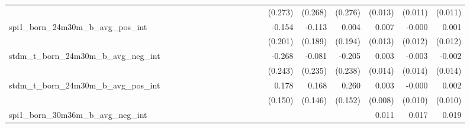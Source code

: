 \begin{tabular}{lrrrrrrrrrrrrrrrrrr}
                                            &              &              &              &              &              &              &              &              &               &              &              &               &      (0.273) &      (0.268) &       (0.276) &      (0.013) &      (0.011) &       (0.011) \\ 
spi1\_born\_24m30m\_b\_avg\_pos\_int        &              &              &              &              &              &              &              &              &               &              &              &               &       -0.154 &       -0.113 &         0.004 &        0.007 &       -0.000 &         0.001 \\ 
                                            &              &              &              &              &              &              &              &              &               &              &              &               &      (0.201) &      (0.189) &       (0.194) &      (0.013) &      (0.012) &       (0.012) \\ 
stdm\_t\_born\_24m30m\_b\_avg\_neg\_int     &              &              &              &              &              &              &              &              &               &              &              &               &       -0.268 &       -0.081 &        -0.205 &        0.003 &       -0.003 &        -0.002 \\ 
                                            &              &              &              &              &              &              &              &              &               &              &              &               &      (0.243) &      (0.235) &       (0.238) &      (0.014) &      (0.014) &       (0.014) \\ 
stdm\_t\_born\_24m30m\_b\_avg\_pos\_int     &              &              &              &              &              &              &              &              &               &              &              &               &        0.178 &        0.168 &         0.260 &        0.003 &       -0.000 &         0.002 \\ 
                                            &              &              &              &              &              &              &              &              &               &              &              &               &      (0.150) &      (0.146) &       (0.152) &      (0.008) &      (0.010) &       (0.010) \\ 
spi1\_born\_30m36m\_b\_avg\_neg\_int        &              &              &              &              &              &              &              &              &               &              &              &               &              &              &               &        0.011 &        0.017 &         0.019 \\ 

\end{tabular}
